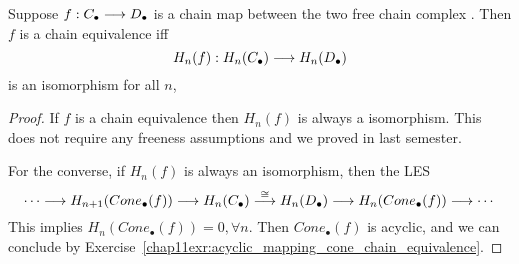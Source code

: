 \documentclass[11pt]{book} %
\begin{document}
\begin{exr}\label{chap11exr:free_chain_equivalence_isomorphic_homology}
Suppose $f:C_\bullet\longrightarrow D_\bullet$ is  a chain map between the two free chain complex . Then $f$ is a chain equivalence iff 
$$
H_n(f): H_n(C_\bullet)\longrightarrow H_n(D_\bullet)
$$
is an isomorphism for all $n$,
\end{exr}
\begin{proof}
If $f$ is a chain equivalence then $H_n (f)$ is always a isomorphism. This does not require any freeness assumptions and we proved in last semester.

For the converse, if $H_n(f)$ is always an isomorphism, then the LES
$$
\cdots\longrightarrow H_{n+1}(Cone_\bullet(f))\longrightarrow H_n(C_\bullet)\overset{\cong}{\longrightarrow} H_n (D_\bullet)\longrightarrow H_n(Cone_\bullet(f))\longrightarrow \cdots
$$
This implies $H_n(Cone_\bullet (f))=0,\forall n$. Then $Cone_\bullet(f)$ is acyclic, and we can conclude by Exercise~\ref{chap11exr:acyclic_mapping_cone_chain_equivalence}.
\end{proof}
\end{document}
